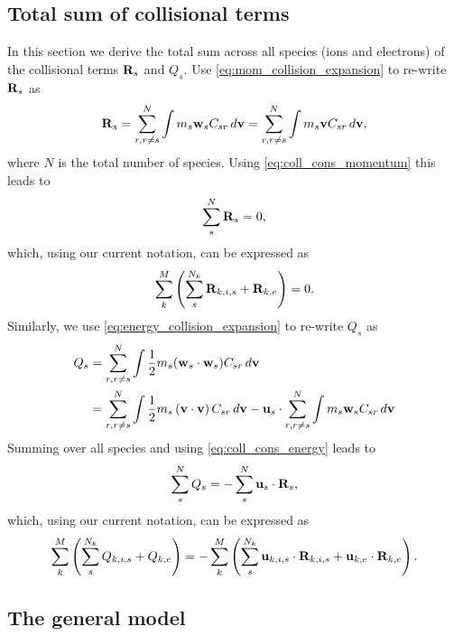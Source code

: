 \documentclass[a4paper,11pt]{report}
\begin{document}
\subsection{Total sum of collisional terms}
In this section we derive the total sum across all species (ions and electrons) of the collisional terms $\mathbf{R}_s$ and $Q_s$. Use \cref{eq:mom_collision_expansion} to re-write $\mathbf{R}_s$ as
\begin{equation*}
    \mathbf{R}_s = \sum_{r,r \ne s}^N \int m_s \mathbf{w}_s C_{s r} \, d\mathbf{v} = \sum^N_{r,r \ne s} \int m_s \mathbf{v} C_{s r} \, d\mathbf{v},
\end{equation*}
where $N$ is the total number of species. Using \cref{eq:coll_cons_momentum} this leads to
\begin{equation}
    \label{eq:sf_sum_mom_collisions}
    \sum_s^N \mathbf{R}_s = 0,
\end{equation}
which, using our current notation, can be expressed as
\begin{equation}
    \label{eq:sf_sum_mom_collisions_mat}
    \sum_k^M \left( \sum_s^{N_k} \mathbf{R}_{k,i,s} + \mathbf{R}_{k,e} \right) = 0.
\end{equation}
Similarly, we use \cref{eq:energy_collision_expansion} to re-write $Q_s$ as
\begin{align*}
    Q_s &= \sum_{r,r \ne s}^N \int \frac{1}{2} m_s (\mathbf{w}_s \cdot \mathbf{w}_s) C_{s r} \, d\mathbf{v} \\
    &= \sum_{r,r \ne s}^N \int \frac{1}{2} m_s \left( \mathbf{v} \cdot \mathbf{v} \right) C_{sr} \, d\mathbf{v} - \mathbf{u}_s \cdot \sum_{r,r \ne s}^N \int m_s \mathbf{w}_s C_{s r} \, d\mathbf{v}
\end{align*}
Summing over all species and using \cref{eq:coll_cons_energy} leads to
\begin{equation}
    \label{eq:sf_sum_energy_collisions}
    \sum_s^N Q_s = - \sum_s^N \mathbf{u}_s \cdot \mathbf{R}_s,
\end{equation}
which, using our current notation, can be expressed as
\begin{equation}
    \label{eq:sf_sum_energy_collisions_mat}
    \sum_k^M \left( \sum_s^{N_k} Q_{k,i,s} + Q_{k,e} \right) = - \sum_k^M \left( \sum_s^{N_k} \mathbf{u}_{k,i,s} \cdot \mathbf{R}_{k,i,s} + \mathbf{u}_{k,e} \cdot \mathbf{R}_{k,e} \right).
\end{equation}

\subsection{The general model}
\label{sec:sf_sm_ms_general}
\end{document}

